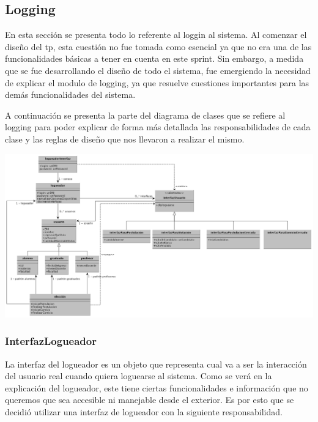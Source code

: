 \subsection{Logging}

En esta secci\'on se presenta todo lo referente al loggin al sistema. Al comenzar el diseño del tp, esta cuesti\'on no fue tomada como esencial ya que no era una de las funcionalidades b\'asicas a tener en cuenta en este sprint. Sin embargo, a medida que se fue desarrollando el diseño de todo el sistema, fue emergiendo la necesidad de explicar el modulo de logging, ya que resuelve cuestiones importantes para las dem\'as funcionalidades del sistema.

A continuaci\'on se presenta la parte del diagrama de clases que se refiere al logging para poder explicar de forma m\'as detallada las responsabilidades de cada clase y las reglas de diseño que nos llevaron a realizar el mismo.

\begin{center}
\includegraphics[scale=0.15]{diagramas/modeloDeClasesLogging.png}
\end{center}



\subsubsection{InterfazLogueador}

La interfaz del logueador es un objeto que representa cual va a ser la interacci\'on del usuario real cuando quiera loguearse al sistema. Como se ver\'a en la explicaci\'on del logueador, este tiene ciertas funcionalidades e informaci\'on que no queremos que sea accesible ni manejable desde el exterior. Es por esto que se decidi\'o utilizar una interfaz de logueador con la siguiente responsabilidad.

